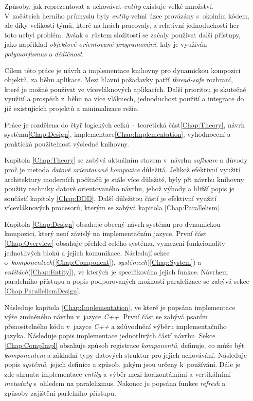 
\iffalse

Způsoby, jak reprezentovat a uchovávat \emph{entity} existuje velké množství. V~začátcích herního průmyslu byly \emph{entity} velmi úzce provázány s~okolním kódem, ale díky velikosti týmů, které na hrách pracovaly, a relativní jednoduchosti her toto nebyl problém. Avšak s~růstem složitosti se začaly používat další přístupy, jako například \emph{objektově orientované programování}, kdy je využíván \emph{polymorfismus} a \emph{dědičnost}. 

Cílem této práce je návrh a implementace knihovny pro dynamickou kompozici objektů, za běhu aplikace. Mezi hlavní požadavky patří \emph{thread-safe}\cite{ThreadSafety} rozhraní, které je možné používat ve vícevláknových aplikacích. Další prioritou je skutečné využití a prospěch z~běhu na více vláknech, jednoduchost použití a integrace do již existujících projektů a minimalizace režie.

Práce je rozdělena do čtyř logických celků -- teoretická část\ref{Chap:Theory}, návrh systému\ref{Chap:Design}, implementace\ref{Chap:Implementation}, vyhodnocení a praktická použitelnost výsledné knihovny.

Kapitola \ref{Chap:Theory} se zabývá aktuálním stavem v~návrhu \emph{software} a důvody proč je metoda \emph{datově orientované kompozice} důležitá. Jelikož efektivní využití architektury moderních počítačů je stále více důležité, byly při návrhu knihovny použity techniky datově orientovaného návrhu\cite{DataOrientedDesign}, jehož výhody a bližší popis je součástí kapitoly \ref{Chap:DDD}. Další důležitou částí je efektivní využití vícevláknových procesorů, kterým se zabývá kapitola \ref{Chap:Parallelism}.

Kapitola \ref{Chap:Design} obsahuje obecný návrh systému pro dynamickou kompozici, který není závislý na implementačním jazyce. První část \ref{Chap:Overview} obsahuje přehled celého systému, vymezení funkcionality jednotlivých bloků a jejich komunikace. Následují sekce o~\emph{komponentech}(\ref{Chap:Component}), \emph{systémech}(\ref{Chap:System}) a \emph{entitách}(\ref{Chap:Entity}), ve kterých je specifikována jejich funkce. Návrhem paralelního přístupu a popis podporovaných možností paralelizace se zabývá sekce \ref{Chap:ParallelismDesign}.

Následuje kapitola \ref{Chap:Implementation}, ve které je popsána implementace výše zmíněného návrhu v~jazyce \emph{C++}. První část se zabývá psaním přenositelného kódu v~jazyce \emph{C++} a zdůvodnění výběru implementačního jazyka. Následuje popis implementace jednotlivých částí návrhu. Sekce \ref{Chap:CompImpl} obsahuje způsob registrace \emph{komponentů}, definuje, co může být \emph{komponentem} a základní typy datových struktur pro jejich uchovávání. Následuje popis \emph{systémů}, jejich definice a způsob, jakým jsou určeny k~používání. Dále je zde shrnuta implementace \emph{entity} a výběr mezi horizontálními a vertikálními \emph{metadaty} s~ohledem na paralelizmus. Nakonec je popsána funkce \emph{refresh} a způsoby zajištění parlelního přístupu.

